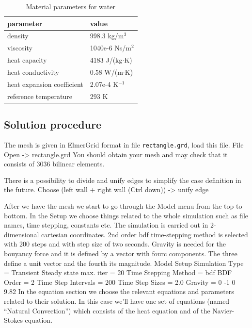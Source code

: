 \begin{table}[h]
\caption{Material parameters for water}
\label{tb:matpar}
\begin{center}
\begin{tabular}{ll} \hline
parameter  & value \\ \hline
density & 998.3 kg/m$^{3}$ \\
viscosity & 1040e-6 Ns/m$^{2}$ \\
heat capacity & 4183 J/(kg$\cdot$K) \\
heat conductivity & 0.58 W/(m$\cdot$K)       \\
heat expansion coefficient & 2.07e-4 K$^{-1}$      \\ 
reference temperature & 293 K       \\ \hline
\end{tabular}
\end{center}
\end{table}


\subsection*{Solution procedure}

The mesh is given in ElmerGrid format in file \texttt{rectangle.grd}, load this file.
\ttbegin
File 
  Open -> rectangle.grd
\ttend
You should obtain your mesh and may check that it consists of 3036 bilinear elements.

There is a possibility to divide and unify edges to simplify the case definition in the future.
\ttbegin
Choose (left wall + right wall (Ctrl down)) -> unify edge
\ttend

After we have the mesh we start to go through the Model menu from the top to bottom. 
In the Setup we choose things related to the whole simulation such as file names, 
time stepping, constants etc.
The simulation is carried out in 2-dimensional cartesian
coordinates. 2nd order bdf time-stepping method is selected with 200 steps
and with step size of two seconds.
Gravity is needed for the bouyancy force and it is defined by a vector with fourc components. 
The three define a unit vector and the fourth its magnitude. 
\ttbegin
Model
  Setup 
    Simulation Type = Transient
    Steady state max. iter = 20
    Time Stepping Method = bdf
    BDF Order = 2
    Time Step Intervals = 200
    Time Step Sizes = 2.0
    Gravity = 0 -1 0 9.82
\ttend
In the equation section we choose the relevant equations and parameters related to their solution. 
In this case we'll have one set of equations (named ``Natural Convection'') which consists of the heat equation
and of the Navier-Stokes equation.

